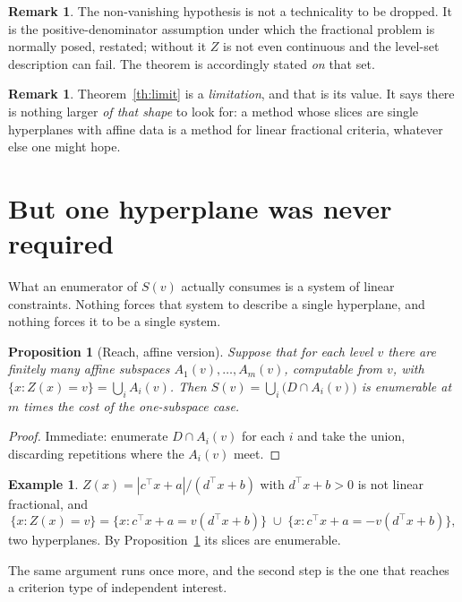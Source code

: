 \documentclass[11pt,a4paper]{article}
\newcommand{\Dset}{D}
\newcommand{\Z}{Z}
\theoremstyle{plain}
\newtheorem{proposition}[theorem]{Proposition}
\theoremstyle{definition}
\newtheorem{remark}[theorem]{Remark}
\newtheorem{example}[theorem]{Example}
\begin{document}
\begin{remark}
The non-vanishing hypothesis is not a technicality to be dropped.  It is the
positive-denominator assumption under which the fractional problem is normally
posed, restated; without it $\Z$ is not even continuous and the level-set
description can fail.  The theorem is accordingly stated \emph{on} that set.
\end{remark}

\begin{remark}
Theorem~\ref{th:limit} is a \emph{limitation}, and that is its value.  It says
there is nothing larger \emph{of that shape} to look for: a method whose slices
are single hyperplanes with affine data is a method for linear fractional
criteria, whatever else one might hope.
\end{remark}

\section{But one hyperplane was never required}

What an enumerator of $S(v)$ actually consumes is a system of linear
constraints.  Nothing forces that system to describe a single hyperplane, and
nothing forces it to be a single system.

\begin{proposition}[Reach, affine version]\label{prop:reach-affine}
Suppose that for each level $v$ there are finitely many affine subspaces
$A_1(v),\dots,A_{m}(v)$, computable from $v$, with
$\{x : \Z(x) = v\} = \bigcup_{i} A_i(v)$.  Then
$S(v) = \bigcup_i \bigl(\Dset \cap A_i(v)\bigr)$ is enumerable at $m$ times the
cost of the one-subspace case.
\end{proposition}

\begin{proof}
Immediate: enumerate $\Dset \cap A_i(v)$ for each $i$ and take the union,
discarding repetitions where the $A_i(v)$ meet.
\end{proof}

\begin{example}\label{ex:abs}
$\Z(x) = |c^{\top}x + a| / (d^{\top}x + b)$ with $d^{\top}x + b > 0$ is not
linear fractional, and
\[
  \{x : \Z(x) = v\} = \{x : c^{\top}x + a = v(d^{\top}x+b)\}
  \;\cup\; \{x : c^{\top}x + a = -v(d^{\top}x+b)\} ,
\]
two hyperplanes.  By Proposition~\ref{prop:reach-affine} its slices are
enumerable.
\end{example}

The same argument runs once more, and the second step is the one that reaches a
criterion type of independent interest.
\end{document}
